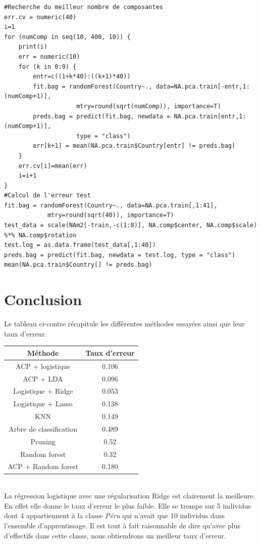 \documentclass[12pt,a4paper]{article}
\begin{document}
\begin{lstlisting}
#Recherche du meilleur nombre de composantes
err.cv = numeric(40)
i=1
for (numComp in seq(10, 400, 10)) {
	print(i)
	err = numeric(10)
	for (k in 0:9) {
		entr=c((1+k*40):((k+1)*40))
		fit.bag = randomForest(Country~., data=NA.pca.train[-entr,1:(numComp+1)], 
					mtry=round(sqrt(numComp)), importance=T)
		preds.bag = predict(fit.bag, newdata = NA.pca.train[entr,1:(numComp+1)], 
					type = "class")
		err[k+1] = mean(NA.pca.train$Country[entr] != preds.bag)
	}
	err.cv[i]=mean(err)
	i=i+1
}
#Calcul de l'erreur test
fit.bag = randomForest(Country~., data=NA.pca.train[,1:41],
			mtry=round(sqrt(40)), importance=T)
test_data = scale(NAm2[-train,-c(1:8)], NA.comp$center, NA.comp$scale) %*% NA.comp$rotation
test.log = as.data.frame(test_data[,1:40])
preds.bag = predict(fit.bag, newdata = test.log, type = "class")
mean(NA.pca.train$Country[] != preds.bag)
\end{lstlisting}


\section{Conclusion}
Le tableau ci-contre récapitule les différentes méthodes essayées ainsi que leur taux d'erreur. \vspace{-4mm}
\begin{center}
	\begin{tabular}{|c|c|}
		\hline
		Méthode & Taux d'erreur \\ \hline
		ACP + logistique & 0.106 \\ \hline
		ACP + LDA & 0.096 \\ \hline
		Logistique + Ridge & 0.053 \\ \hline
		Logistique + Lasso & 0.138 \\ \hline
		KNN & 0.149 \\ \hline
		Arbre de classification & 0.489 \\ \hline
		Pruning & 0.52 \\ \hline
		Random forest & 0.32 \\ \hline
		ACP + Random forest & 0.180 \\ \hline
	\end{tabular}
	\label{tab:resume}
\end{center}
~\\
La régression logistique avec une régularisation Ridge est clairement la
meilleure. En effet elle donne le taux d'erreur le plus faible. Elle se trompe
sur 5 individus dont 4 appartiennent à la classe \textit{Péru} qui n'avait que
10 individus dans l'ensemble d'apprentissage. Il est tout à fait raisonnable de
dire qu'avec plus d'effectifs dans cette classe, nous obtiendrons un meilleur
taux d'erreur.\vspace{3mm}\\
\end{document}
